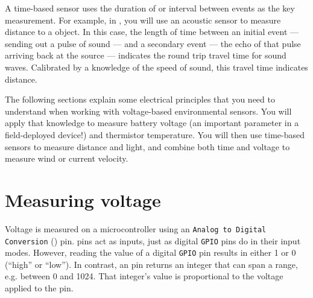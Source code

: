 A time-based sensor uses the duration of or interval between events as the key measurement.
For example, in , you will use an acoustic sensor to measure distance to a object.
In this case, the length of time between an initial event --- sending out a pulse of sound --- and a secondary event --- the echo of that pulse arriving back at the source --- indicates the round trip travel time for sound waves.
Calibrated by a knowledge of the speed of sound, this travel time indicates distance.

The following sections explain some electrical principles that you need to understand when working with voltage-based environmental sensors. You will apply that knowledge to measure battery voltage (an important parameter in a field-deployed device!) and thermistor temperature. You will then use time-based sensors to measure distance and light, and combine both time and voltage to measure wind or current velocity. 

%
%
%

\section{Measuring voltage}
Voltage is measured on a microcontroller using an \texttt{Analog to Digital Conversion} (\adc) pin.
\adc pins act as inputs, just as digital \texttt{GPIO} pins do in their input modes.
However, reading the value of a digital \texttt{GPIO} pin results in either 1 or 0 (``high'' or ``low''). In contrast, an \adc pin returns an integer that can span a range, e.g. between 0 and 1024.
That integer's value is proportional to the voltage applied to the \adc pin. 

